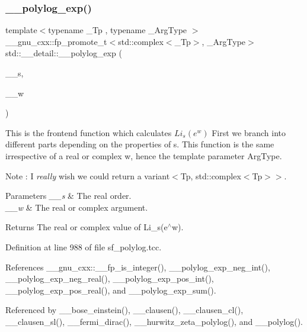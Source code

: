 \subsubsection{\texorpdfstring{\+\_\+\+\_\+polylog\+\_\+exp()}{\_\_polylog\_exp()}}
{\footnotesize\ttfamily template$<$typename \+\_\+\+Tp , typename \+\_\+\+Arg\+Type $>$ \\
\+\_\+\+\_\+gnu\+\_\+cxx\+::fp\+\_\+promote\+\_\+t$<$std\+::complex$<$\+\_\+\+Tp$>$, \+\_\+\+Arg\+Type$>$ std\+::\+\_\+\+\_\+detail\+::\+\_\+\+\_\+polylog\+\_\+exp (\begin{DoxyParamCaption}\item[{\+\_\+\+Tp}]{\+\_\+\+\_\+s,  }\item[{\+\_\+\+Arg\+Type}]{\+\_\+\+\_\+w }\end{DoxyParamCaption})}

This is the frontend function which calculates $ Li_s(e^w) $ First we branch into different parts depending on the properties of s. This function is the same irrespective of a real or complex w, hence the template parameter Arg\+Type.

\begin{DoxyNote}{Note}
\+: I {\itshape really} wish we could return a variant$<$Tp, std\+::complex$<$\+Tp$>$$>$.
\end{DoxyNote}

\begin{DoxyParams}{Parameters}
{\em \+\_\+\+\_\+s} & The real order. \\
\hline
{\em \+\_\+\+\_\+w} & The real or complex argument. \\
\hline
\end{DoxyParams}
\begin{DoxyReturn}{Returns}
The real or complex value of Li\+\_\+s(e$^\wedge$w). 
\end{DoxyReturn}


Definition at line 988 of file sf\+\_\+polylog.\+tcc.



References \+\_\+\+\_\+gnu\+\_\+cxx\+::\+\_\+\+\_\+fp\+\_\+is\+\_\+integer(), \+\_\+\+\_\+polylog\+\_\+exp\+\_\+neg\+\_\+int(), \+\_\+\+\_\+polylog\+\_\+exp\+\_\+neg\+\_\+real(), \+\_\+\+\_\+polylog\+\_\+exp\+\_\+pos\+\_\+int(), \+\_\+\+\_\+polylog\+\_\+exp\+\_\+pos\+\_\+real(), and \+\_\+\+\_\+polylog\+\_\+exp\+\_\+sum().



Referenced by \+\_\+\+\_\+bose\+\_\+einstein(), \+\_\+\+\_\+clausen(), \+\_\+\+\_\+clausen\+\_\+cl(), \+\_\+\+\_\+clausen\+\_\+sl(), \+\_\+\+\_\+fermi\+\_\+dirac(), \+\_\+\+\_\+hurwitz\+\_\+zeta\+\_\+polylog(), and \+\_\+\+\_\+polylog().

